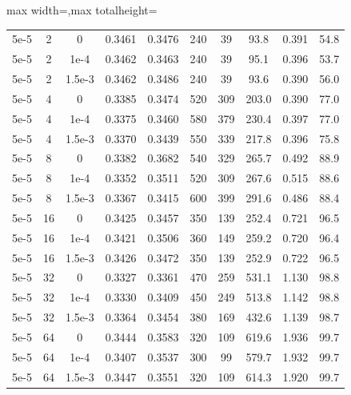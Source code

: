 \begin{table}[p]
\begin{adjustbox}{max width=\textwidth,max totalheight=\textheight}
\begin{tabular}{cccccccccc}
5e-5&2&0&0.3461&0.3476&240&39&93.8&0.391&54.8\\
5e-5&2&1e-4&0.3462&0.3463&240&39&95.1&0.396&53.7\\
5e-5&2&1.5e-3&0.3462&0.3486&240&39&93.6&0.390&56.0\\
5e-5&4&0&0.3385&0.3474&520&309&203.0&0.390&77.0\\
5e-5&4&1e-4&0.3375&0.3460&580&379&230.4&0.397&77.0\\
5e-5&4&1.5e-3&0.3370&0.3439&550&339&217.8&0.396&75.8\\
5e-5&8&0&0.3382&0.3682&540&329&265.7&0.492&88.9\\
5e-5&8&1e-4&0.3352&0.3511&520&309&267.6&0.515&88.6\\
5e-5&8&1.5e-3&0.3367&0.3415&600&399&291.6&0.486&88.4\\
5e-5&16&0&0.3425&0.3457&350&139&252.4&0.721&96.5\\
5e-5&16&1e-4&0.3421&0.3506&360&149&259.2&0.720&96.4\\
5e-5&16&1.5e-3&0.3426&0.3472&350&139&252.9&0.722&96.5\\
5e-5&32&0&0.3327&0.3361&470&259&531.1&1.130&98.8\\
5e-5&32&1e-4&0.3330&0.3409&450&249&513.8&1.142&98.8\\
5e-5&32&1.5e-3&0.3364&0.3454&380&169&432.6&1.139&98.7\\
5e-5&64&0&0.3444&0.3583&320&109&619.6&1.936&99.7\\
5e-5&64&1e-4&0.3407&0.3537&300&99&579.7&1.932&99.7\\
5e-5&64&1.5e-3&0.3447&0.3551&320&109&614.3&1.920&99.7\\


\end{tabular}
\end{adjustbox}
\end{table}
